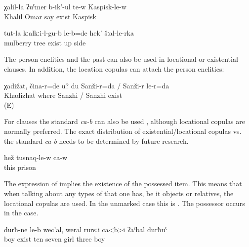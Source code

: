 \begin{exe}
	\ex	\label{ex:Omar's Khalil is in Kaspisk}
	\gll	χalil-la	ʡuˁmer	b-ik'-ul	te-w	Kaspisk-le-w\\
		Khalil	Omar	say	exist	Kaspisk\\
	\glt	{}

	\ex	\label{ex:‎They were under the mulberry tree, from that side}
	\gll	tut-la	kːalkːi-l-gu-b	le-b=de	hek'	šːal-le-rka\\
		mulberry	tree	exist	up	side\\
	\glt	{}

\end{exe}

The person enclitics  and the past   can also be used in locational or existential clauses. In addition, the location copulas can attach the person enclitics:
%
\begin{exe}
	\ex	\label{ex:‎Khadizhat, where are you? I am in Sanzhi}
	\gll	χadižat,	čina-r=de	u?	du	Sanži-r=da	/	Sanži-r	le-r=da\\
		Khadizhat	where			Sanzhi	/ Sanzhi exist\\
	\glt	{} (E)
\end{exe}

For  clauses the standard  \textit{ca-b} can also be used , although locational copulas are normally preferred. The exact distribution of existential/locational copulas vs. the standard  \textit{ca-b} needs to be determined by future research. 

 \begin{exe}
	\ex	\label{ex:‎He is in prison}
	\gll	hež	tusnaq-le-w	ca-w\\
		this	prison	\\
	\glt	{}
\end{exe}

 
The expression of  implies the existence of the possessed item. This means that when talking about any types of  that one has, be it objects or relatives, the locational copulas are used. In the unmarked case this is  . The possessor occurs in the  case.
%
\begin{exe}
	\ex	\label{ex:‎(I) have ten children; they are seven girls and three boys}
	\gll	durħ-ne	le-b	wec'al,	weral	rursːi	ca<b>i	ʡaˁbal	durħuˁ\\
		boy	exist	ten	seven	girl		three	boy\\
	\glt	{}
\end{exe}

